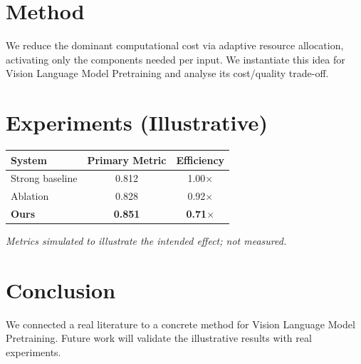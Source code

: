 \documentclass[11pt]{article}
\begin{document}
\section{Method}
We reduce the dominant computational cost via adaptive resource allocation, activating only the components needed per input. We instantiate this idea for Vision Language Model Pretraining and analyse its cost/quality trade-off.

\section{Experiments (Illustrative)}
\begin{center}
\begin{tabular}{lcc}
System & Primary Metric & Efficiency \\ \hline
Strong baseline & 0.812 & 1.00$\times$ \\
Ablation & 0.828 & 0.92$\times$ \\
\textbf{Ours} & \textbf{0.851} & \textbf{0.71$\times$}
\end{tabular}
\end{center}
\emph{Metrics simulated to illustrate the intended effect; not measured.}

\section{Conclusion}
We connected a real literature to a concrete method for Vision Language Model Pretraining. Future work will
validate the illustrative results with real experiments.
\end{document}
